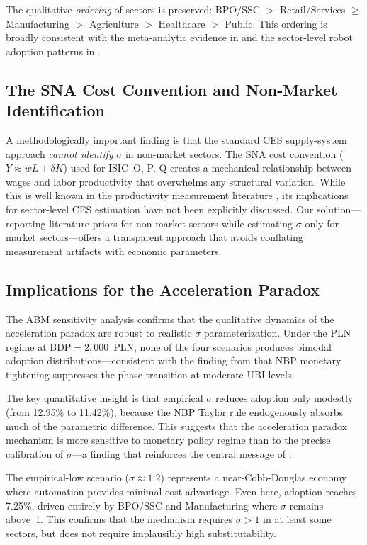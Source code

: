 \documentclass[11pt,a4paper]{article}
\begin{document}
The qualitative \emph{ordering} of sectors is preserved: BPO/SSC $>$ Retail/Services $\geq$ Manufacturing $>$ Agriculture $>$ Healthcare $>$ Public.
This ordering is broadly consistent with the meta-analytic evidence in \autocite{knoblach2021capital} and the sector-level robot adoption patterns in \autocite{adachi2025capital}.

\subsection{The SNA Cost Convention and Non-Market Identification}

A methodologically important finding is that the standard CES supply-system approach \emph{cannot identify} $\sigma$ in non-market sectors.
The SNA cost convention ($Y \approx wL + \delta K$) used for ISIC~O, P, Q creates a mechanical relationship between wages and labor productivity that overwhelms any structural variation.
While this is well known in the productivity measurement literature \autocite{oecd2024sna}, its implications for sector-level CES estimation have not been explicitly discussed.
Our solution---reporting literature priors for non-market sectors while estimating $\sigma$ only for market sectors---offers a transparent approach that avoids conflating measurement artifacts with economic parameters.

\subsection{Implications for the Acceleration Paradox}

The ABM sensitivity analysis confirms that the qualitative dynamics of the acceleration paradox are robust to realistic $\sigma$ parameterization.
Under the PLN regime at BDP$=2{,}000$~PLN, none of the four scenarios produces bimodal adoption distributions---consistent with the finding from \autocite{maciaszek2026monetary} that NBP monetary tightening suppresses the phase transition at moderate UBI levels.

The key quantitative insight is that empirical $\sigma$ reduces adoption only modestly (from 12.95\% to 11.42\%), because the NBP Taylor rule endogenously absorbs much of the parametric difference.
This suggests that the acceleration paradox mechanism is more sensitive to monetary policy regime than to the precise calibration of $\sigma$---a finding that reinforces the central message of \autocite{maciaszek2026monetary}.

The empirical-low scenario ($\bar{\sigma} \approx 1.2$) represents a near-Cobb-Douglas economy where automation provides minimal cost advantage.
Even here, adoption reaches 7.25\%, driven entirely by BPO/SSC and Manufacturing where $\sigma$ remains above~1.
This confirms that the mechanism requires $\sigma > 1$ in at least some sectors, but does not require implausibly high substitutability.
\end{document}
